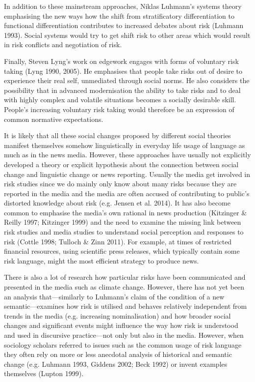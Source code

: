 In addition to these mainstream approaches, Niklas Luhmann's systems theory emphasising the new ways how the shift from stratificatory differentiation to functional differentiation contributes to increased debates about risk (Luhmann 1993). Social systems would try to get shift risk to other areas which would result in risk conflicts and negotiation of risk.

Finally, Steven Lyng's work on edgework engages with forms of voluntary risk taking (Lyng 1990, 2005). He emphasises that people take risks out of desire to experience their real self, unmediated through social norms. He also considers the possibility that in advanced modernisation the ability to take risks and to deal with highly complex and volatile situations becomes a socially desirable skill. People's increasing voluntary risk taking would therefore be an expression of common normative expectations.

It is likely that all these social changes proposed by different social theories manifest themselves somehow linguistically in everyday life usage of language as much as in the news media. However, these approaches have usually not explicitly developed a theory or explicit hypothesis about the connection between social change and linguistic change or news reporting. Usually the media get involved in risk studies since we do mainly only know about many risks because they are reported in the media and the media are often accused of contributing to public's distorted knowledge about risk (e.g. Jensen et al. 2014). It has also become common to emphasise the media's own rational in news production (Kitzinger \& Reilly 1997; Kitzinger 1999) and the need to examine the missing link between risk studies and media studies to understand social perception and responses to risk (Cottle 1998; Tulloch \& Zinn 2011). For example, at times of restricted financial resources, using scientific press releases, which typically contain some risk language, might the most efficient strategy to produce news. 

There is also a lot of research how particular risks have been communicated and presented in the media such as climate change. However, there has not yet been an analysis that---similarly to Luhmann's claim of the condition of a new semantic---examines how risk is utilised and behaves relatively independent from trends in the media (e.g. increasing nominalisation) and how broader social changes and significant events might influence the way how risk is understood and used in discursive practice---not only but also in the media. However, when sociology scholars referred to issues such as the common usage of risk language they often rely on more or less anecdotal analysis of historical and semantic change (e.g. Luhmann 1993, Giddens 2002; Beck 1992) or invent examples themselves (Lupton 1999). 

